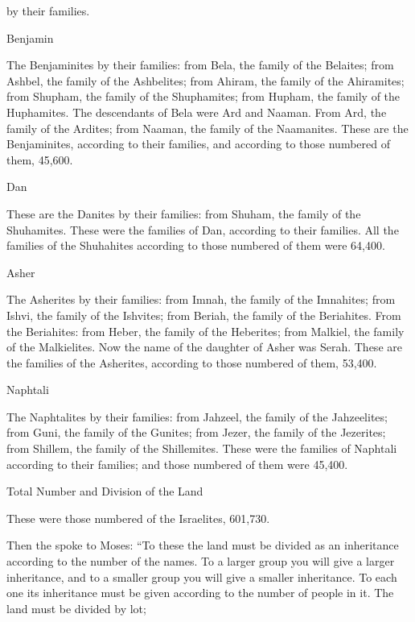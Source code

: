 {by their families.
\par }{\SH Benjamin
\par }{\PP {}The Benjaminites
by their families: from Bela,
the family
of the Belaites;
from Ashbel,
the family
of the Ashbelites;
from Ahiram,
the family
of the Ahiramites;
from Shupham,
the family
of the Shuphamites;
from Hupham,
the family
of the Huphamites.
The descendants
of Bela
were Ard
and Naaman.
From Ard, the family
of the Ardites;
from Naaman,
the family
of the Naamanites.
These
are the Benjaminites,
according to their families,
and according to those numbered
of them, 45,600.
\par }{\SH Dan
\par }{\PP {}These
are the Danites
by their families: from Shuham,
the family
of the Shuhamites.
These
were the families
of Dan,
according to their families.
All
the families
of the Shuhahites
according to those numbered
of them were 64,400.
\par }{\SH Asher
\par }{\PP {}The Asherites
by their families: from Imnah,
the family
of the Imnahites;
from Ishvi,
the family
of the Ishvites;
from Beriah,
the family
of the Beriahites.
From the Beriahites: from Heber,
the family
of the Heberites;
from Malkiel,
the family
of the Malkielites.
Now the name
of the daughter
of Asher
was Serah.
These
are the families
of the Asherites,
according to those numbered
of them, 53,400.
\par }{\SH Naphtali
\par }{\PP {}The Naphtalites
by their families: from Jahzeel,
the family
of the Jahzeelites;
from Guni,
the family
of the Gunites;
from Jezer,
the family
of the Jezerites;
from Shillem,
the family
of the Shillemites.
These
were the families
of Naphtali
according to their families;
and those numbered
of them were 45,400.
\par }{\SH Total Number and Division of the Land
\par }{\PP {}These
were those numbered
of the Israelites,
601,730.
\par }{\PP {}Then the
{}
spoke
to
Moses:
“To these
the land
must be divided
as an inheritance
according to the number
of the names.
To a
larger
group
you will give a
larger inheritance,
and to a smaller
group you will give a
smaller
inheritance.
To each
one its inheritance
must be given
according
to the number of people in it.
The land
must
be divided
by lot;
}
